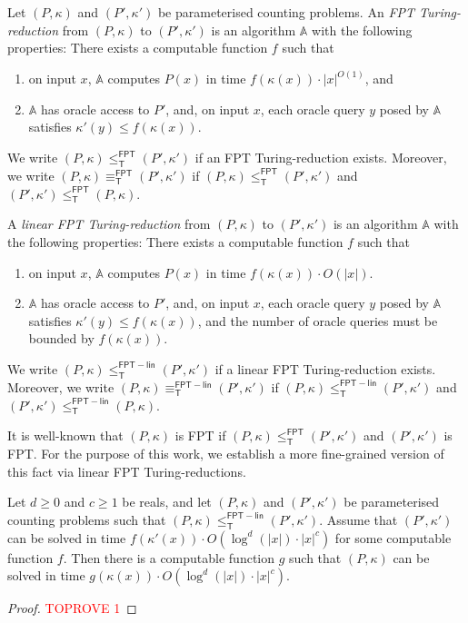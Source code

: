\documentclass[authorcolumns,numberwithinsect]{no-lipics-v2022}
\newcommand{\fptred}{\leq^{\mathsf{FPT}}_{\mathsf{T}}}
\newcommand{\fptinterred}{\equiv^{\mathsf{FPT}}_{\mathsf{T}}}
\newcommand{\fptlinred}{\leq^{\mathsf{FPT-lin}}_{\mathsf{T}}}
\newcommand{\fptinterlinred}{\equiv^{\mathsf{FPT-lin}}_{\mathsf{T}}}
\begin{document}
\begin{definition}
    Let $(P,\kappa)$ and $(P',\kappa')$ be parameterised counting problems. An \emph{FPT Turing-reduction} from $(P,\kappa)$ to $(P',\kappa')$ is an algorithm $\mathbb{A}$ with the following properties: There exists a computable function $f$ such that
    \begin{enumerate}
        \item on input $x$, $\mathbb{A}$ computes $P(x)$ in time $f(\kappa(x))\cdot |x|^{O(1)}$, and
        \item $\mathbb{A}$ has oracle access to $P'$, and, on input $x$, each oracle query $y$ posed by $\mathbb{A}$ satisfies $\kappa'(y)\leq f(\kappa(x))$.
    \end{enumerate}
    We write $(P,\kappa)\fptred (P',\kappa')$ if an FPT Turing-reduction exists. Moreover, we write $(P,\kappa)\fptinterred (P',\kappa')$ if $(P,\kappa)\fptred (P',\kappa')$ and $(P',\kappa')\fptred (P,\kappa)$.

    A \emph{linear FPT Turing-reduction} from $(P,\kappa)$ to $(P',\kappa')$ is an algorithm $\mathbb{A}$ with the following properties: There exists a computable function $f$ such that
    \begin{enumerate}
        \item on input $x$, $\mathbb{A}$ computes $P(x)$ in time $f(\kappa(x))\cdot O(|x|)$.
        \item $\mathbb{A}$ has oracle access to $P'$, and, on input $x$, each oracle query $y$ posed by $\mathbb{A}$ satisfies $\kappa'(y)\leq f(\kappa(x))$, and the number of oracle queries must be bounded by $f(\kappa(x))$.
    \end{enumerate}
    We write $(P,\kappa)\fptlinred (P',\kappa')$ if a linear FPT Turing-reduction exists. Moreover, we write $(P,\kappa)\fptinterlinred (P',\kappa')$ if $(P,\kappa)\fptlinred (P',\kappa')$ and $(P',\kappa')\fptlinred (P,\kappa)$.
\end{definition}

It is well-known that $(P,\kappa)$ is FPT if $(P,\kappa)\fptred (P',\kappa')$ and $(P',\kappa')$ is FPT. For the purpose of this work, we establish a more fine-grained version of this fact via linear FPT Turing-reductions.

\begin{lemma}
    Let $d\geq 0$ and $c\geq 1$ be reals, and let $(P,\kappa)$ and $(P',\kappa')$ be parameterised counting problems such that $(P,\kappa)\fptlinred (P',\kappa')$. Assume that $(P',\kappa')$ can be solved in time $f(\kappa'(x))\cdot O(\log^d(|x|)\cdot |x|^c)$ for some computable function $f$. Then there is a computable function $g$ such that $(P,\kappa)$ can be solved in time $g(\kappa(x))\cdot O(\log^d(|x|)\cdot |x|^c)$. 
\end{lemma}
\begin{proof}\textcolor{red}{TOPROVE 1}\end{proof}
\end{document}
